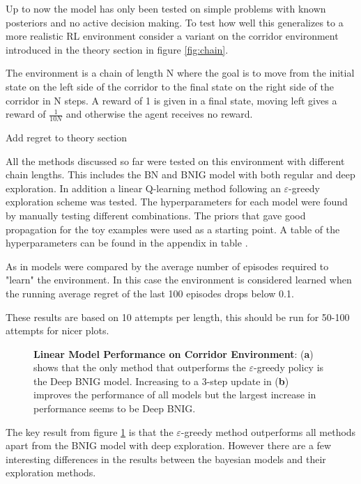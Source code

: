 Up to now the model has only been tested on simple problems with known posteriors and no active decision making. To test how well this generalizes to a more realistic RL environment consider a variant on the corridor environment introduced in the theory section in figure \ref{fig:chain}.

The environment is a chain of length N where the goal is to move from the initial state on the left side of the corridor to the final state on the right side of the corridor in N steps. A reward of 1 is given in a final state, moving left gives a reward of $\frac{1}{10N}$ and otherwise the agent receives no reward.

\todo Add regret to theory section

All the methods discussed so far were tested on this environment with different chain lengths. This includes the BN and BNIG model with both regular and deep exploration. In addition a linear Q-learning method following an $\varepsilon$-greedy exploration scheme was tested. The hyperparameters for each model were found by manually testing different combinations. The priors that gave good propagation for the toy examples were used as a starting point. A table of the hyperparameters can be found in the appendix in table \todo.

As in \cite{osband_2018} models were compared by the average number of episodes required to "learn" the environment. In this case the environment is considered learned when the running average regret of the last 100 episodes drops below 0.1.

\todo These results are based on 10 attempts per length, this should be run for 50-100 attempts for nicer plots.

\begin{figure}[H]
    \centering
    \caption{\textbf{Linear Model Performance on Corridor Environment}: (\textbf{a}) shows that the only method that outperforms the $\varepsilon$-greedy policy is the Deep BNIG model. Increasing to a 3-step update in (\textbf{b}) improves the performance of all models but the largest increase in performance seems to be Deep BNIG.}
    \label{fig:linear_corridor}
\end{figure}

The key result from figure \ref{fig:linear_corridor} is that the $\varepsilon$-greedy method outperforms all methods apart from the BNIG model with deep exploration. However there are a few interesting differences in the results between the bayesian models and their exploration methods. 

